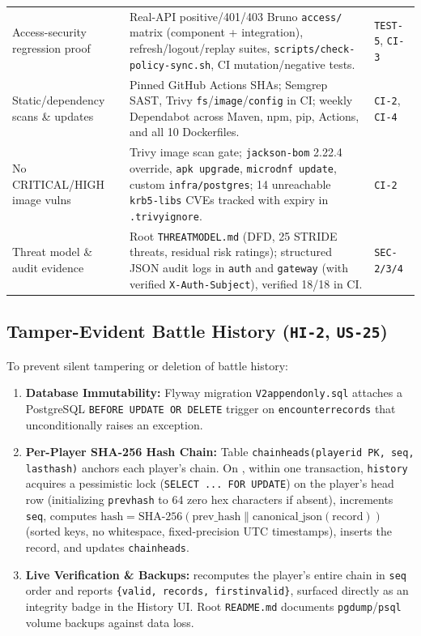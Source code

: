 \documentclass[10.5pt,a4paper]{article}
\DeclareRobustCommand{\code}[1]{\begingroup\def\_{\textunderscore\allowbreak}\texttt{#1}\endgroup}
\begin{document}
\begin{table}[H]
\begin{tabularx}{\linewidth}{@{}L{3.5cm}Y L{2.25cm}@{}}
Access-security regression proof & Real-API positive/401/403 Bruno \code{access/} matrix (component + integration), refresh/logout/replay suites, \code{scripts/check-policy-sync.sh}, CI mutation/negative tests. & \code{TEST-5}, \code{CI-3} \\
Static/dependency scans \& updates & Pinned GitHub Actions SHAs; Semgrep SAST, Trivy \code{fs}/\code{image}/\code{config} in CI; weekly Dependabot across Maven, npm, pip, Actions, and all 10 Dockerfiles. & \code{CI-2}, \code{CI-4} \\
No CRITICAL/HIGH image vulns & Trivy image scan gate; \code{jackson-bom} 2.22.4 override, \code{apk upgrade}, \code{microdnf update}, custom \code{infra/postgres}; 14 unreachable \code{krb5-libs} CVEs tracked with expiry in \code{.trivyignore}. & \code{CI-2} \\
Threat model \& audit evidence & Root \code{THREAT\_MODEL.md} (DFD, 25 STRIDE threats, residual risk ratings); structured JSON audit logs in \code{auth} and \code{gateway} (with verified \code{X-Auth-Subject}), verified 18/18 in CI. & \code{SEC-2/3/4} \\
\bottomrule
\end{tabularx}
\end{table}

\subsection{Tamper-Evident Battle History (\code{HI-2}, \code{US-25})}

To prevent silent tampering or deletion of battle history:
\begin{enumerate}
  \item \textbf{Database Immutability:} Flyway migration \code{V2\_\_append\_only.sql} attaches a PostgreSQL \code{BEFORE UPDATE OR DELETE} trigger on \code{encounter\_records} that unconditionally raises an exception.
  \item \textbf{Per-Player SHA-256 Hash Chain:} Table \code{chain\_heads(player\_id PK, seq, last\_hash)} anchors each player's chain. On , within one transaction, \code{history} acquires a pessimistic lock (\code{SELECT ... FOR UPDATE}) on the player's head row (initializing \code{prev\_hash} to 64 zero hex characters if absent), increments \code{seq}, computes $\text{hash} = \text{SHA-256}(\text{prev\_hash} \parallel \text{canonical\_json}(\text{record}))$ (sorted keys, no whitespace, fixed-precision UTC timestamps), inserts the record, and updates \code{chain\_heads}.
  \item \textbf{Live Verification \& Backups:}  recomputes the player's entire chain in \code{seq} order and reports \code{\{valid, records, first\_invalid\}}, surfaced directly as an integrity badge in the History UI. Root \code{README.md} documents \code{pg\_dump}/\code{psql} volume backups against data loss.
\end{enumerate}
\end{document}
